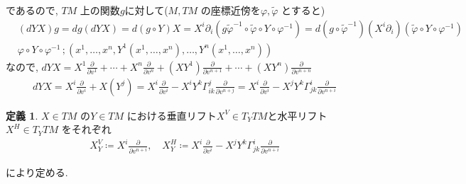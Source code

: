 \documentclass[twocolumn, landscape, a4paper , 8pt, fleqn, titlepage ]{jsarticle}
\theoremstyle{definition}
\newtheorem{dfn}{定義}[section]
\begin{document}
であるので, $TM$ 上の関数$g$に対して($M, TM$ の座標近傍を$\varphi, \tilde \varphi$ とすると)
\begin{align*} &(dYX)g = dg(dYX) = d(g \circ Y ) X = X^i \partial_i (g \tilde \varphi ^{-1} \circ \tilde \varphi  \circ Y \circ \varphi^{-1} ) = d(g \circ \tilde \varphi^{-1})  (X^i \partial_i ) (\tilde \varphi  \circ Y \circ \varphi^{-1})   \\ & 
\varphi  \circ Y \circ \varphi^{-1}\, ; (x^1, \ldots, x^n, Y^1(x^1,\ldots, x^n), \ldots, Y^n(x^1,\ldots, x^n))
\end{align*}
なので, $dYX = X^1 \frac{\partial}{\partial v^1 } + \cdots + X^n \frac{\partial}{\partial v^n } + (XY^1) \frac{\partial}{\partial v^{n+1} } + \cdots + (X Y^n) \frac{\partial}{\partial v^{n+n} }$
\begin{align*} dYX = X^i \frac{\partial}{\partial v^i } + X(Y^j) = X^i \frac{\partial}{\partial v^i } - X^i Y^k \Gamma_{ik}^j \frac{\partial}{\partial v^{n+j} }  = X^i \frac{\partial}{\partial v^i } - X^j Y^k \Gamma_{jk}^i \frac{\partial}{\partial v^{n+i } }   \end{align*}

\begin{dfn}
$X \in TM$ の$Y \in TM$ における垂直リフト$X^V \in T_Y TM $と水平リフト$X^H \in T_Y TM$ をそれぞれ
\begin{align*} X^V_Y \coloneqq X^i \frac{\partial}{\partial v^{n+i}} , \quad X^H_Y \coloneqq X^i \frac{\partial}{\partial v^i } - X^j Y^k \Gamma_{jk}^i \frac{\partial}{\partial v^{n+i } }   \end{align*}
\end{dfn}

により定める. 
\end{document}
